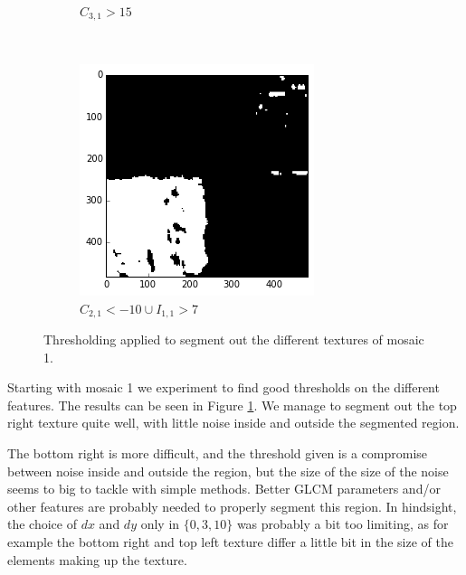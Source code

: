 \documentclass[a4paper]{article}
\begin{document}
\begin{figure}
\begin{subfigure}[b]{0.30\textwidth}
        \caption{%
            $C_{3,1} > 15$
        }
    \end{subfigure}
    ~
    \begin{subfigure}[b]{0.30\textwidth}
        \centering
        \includegraphics[width=\textwidth]{segm_1_c21_i11.png}
        \caption{%
            $C_{2,1} < -10 \cup I_{1,1} > 7$
        }
    \end{subfigure}
    \caption{%
        Thresholding applied to segment out the different textures of
        mosaic 1.
    }
    \label{fig:m1_segm}
\end{figure}

Starting with mosaic 1 we experiment to find good thresholds on the
different features. The results can be seen in Figure \ref{fig:m1_segm}.
We manage to segment out the top right texture quite well, with little
noise inside and outside the segmented region.

The bottom right is more difficult, and the threshold given is a
compromise between noise inside and outside the region, but the size of
the size of the noise seems to big to tackle with simple methods. Better
GLCM parameters and/or other features are probably needed to properly
segment this region. In hindsight, the choice of $dx$ and $dy$ only in
$\{0, 3, 10\}$ was probably a bit too limiting, as for example the
bottom right and top left texture differ a little bit in the size of the
elements making up the texture.
\end{document}
